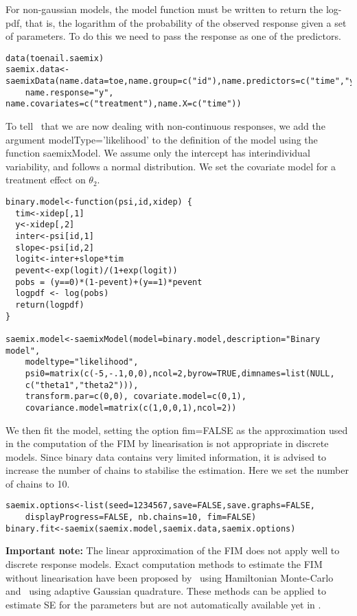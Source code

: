 For non-gaussian models, the model function must be written to return the log-pdf, that is, the logarithm of the probability of the observed response given a set of parameters. To do this we need to pass the response as one of the predictors.
\begin{verbatim}
data(toenail.saemix)
saemix.data<-saemixData(name.data=toe,name.group=c("id"),name.predictors=c("time","y"), 
    name.response="y", name.covariates=c("treatment"),name.X=c("time"))
\end{verbatim}

To tell \monolix~that we are now dealing with non-continuous responses, we add the argument {\sf modelType='likelihood'} to the definition of the model using the function {\sf saemixModel}. We assume only the intercept has interindividual variability, and follows a normal distribution. We set the covariate model for a treatment effect on $\theta_2$. 
\begin{verbatim}
binary.model<-function(psi,id,xidep) {
  tim<-xidep[,1]
  y<-xidep[,2]
  inter<-psi[id,1]
  slope<-psi[id,2]
  logit<-inter+slope*tim
  pevent<-exp(logit)/(1+exp(logit))
  pobs = (y==0)*(1-pevent)+(y==1)*pevent
  logpdf <- log(pobs)
  return(logpdf)
}

saemix.model<-saemixModel(model=binary.model,description="Binary model",
    modeltype="likelihood",
    psi0=matrix(c(-5,-.1,0,0),ncol=2,byrow=TRUE,dimnames=list(NULL,
    c("theta1","theta2"))),
    transform.par=c(0,0), covariate.model=c(0,1),
    covariance.model=matrix(c(1,0,0,1),ncol=2))
\end{verbatim}

We then fit the model, setting the option {\sf fim=FALSE} as the approximation used in the computation of the FIM by linearisation is not appropriate in discrete models. Since binary data contains very limited information, it is advised to increase the number of chains to stabilise the estimation. Here we set the number of chains to 10.
\begin{verbatim}
saemix.options<-list(seed=1234567,save=FALSE,save.graphs=FALSE, 
    displayProgress=FALSE, nb.chains=10, fim=FALSE)
binary.fit<-saemix(saemix.model,saemix.data,saemix.options)
\end{verbatim}

{\bf Important note:} The linear approximation of the FIM does not apply well to discrete response models. Exact computation methods to estimate the FIM without linearisation have been proposed by~\cite{Riviere16} using Hamiltonian Monte-Carlo and~\cite{Ueckert16} using adaptive Gaussian quadrature. These methods can be applied to estimate SE for the parameters but are not automatically available yet in \monolix.

